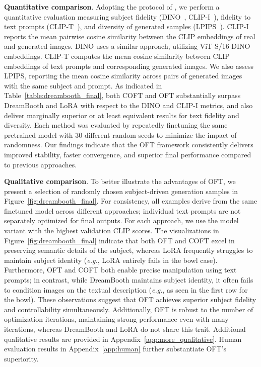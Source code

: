 \textbf{Quantitative comparison}. Adopting the protocol of \cite{ruiz2023dreambooth}, we perform a quantitative evaluation measuring subject fidelity (DINO~\cite{caron2021emerging}, CLIP-I~\cite{radford2021learning}), fidelity to text prompts (CLIP-T~\cite{radford2021learning}), and diversity of generated samples (LPIPS~\cite{zhang2018unreasonable}). CLIP-I reports the mean pairwise cosine similarity between the CLIP embeddings of real and generated images. DINO uses a similar approach, utilizing ViT S/16 DINO embeddings. CLIP-T computes the mean cosine similarity between CLIP embeddings of text prompts and corresponding generated images. We also assess LPIPS, reporting the mean cosine similarity across pairs of generated images with the same subject and prompt. As indicated in Table~\ref{table:dreambooth_final}, both COFT and OFT substantially surpass DreamBooth and LoRA with respect to the DINO and CLIP-I metrics, and also deliver marginally superior or at least equivalent results for text fidelity and diversity. Each method was evaluated by repeatedly finetuning the same pretrained model with 30 different random seeds to minimize the impact of randomness. Our findings indicate that the OFT framework consistently delivers improved stability, faster convergence, and superior final performance compared to previous approaches.

\textbf{Qualitative comparison}. To better illustrate the advantages of OFT, we present a selection of randomly chosen subject-driven generation samples in Figure~\ref{fig:dreambooth_final}. For consistency, all examples derive from the same finetuned model across different approaches; individual text prompts are not separately optimized for final outputs. For each approach, we use the model variant with the highest validation CLIP scores. The visualizations in Figure~\ref{fig:dreambooth_final} indicate that both OFT and COFT excel in preserving semantic details of the subject, whereas LoRA frequently struggles to maintain subject identity (\emph{e.g.}, LoRA entirely fails in the bowl case). Furthermore, OFT and COFT both enable precise manipulation using text prompts; in contrast, while DreamBooth maintains subject identity, it often fails to condition images on the textual description (\emph{e.g.}, as seen in the first row for the bowl). These observations suggest that OFT achieves superior subject fidelity and controllability simultaneously. Additionally, OFT is robust to the number of optimization iterations, maintaining strong performance even with many iterations, whereas DreamBooth and LoRA do not share this trait. Additional qualitative results are provided in Appendix~\ref{app:more_qualitative}. Human evaluation results in Appendix~\ref{app:human} further substantiate OFT’s superiority.


